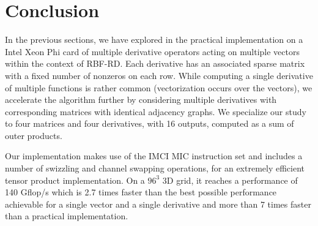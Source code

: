 \documentclass[10pt,conference,compsocconf]{IEEEtran}
\newcommand{\todo}[1]{{\color{red}\textbf{\hl{#1}}\xspace}}
\begin{document}



\section{Conclusion}
\label{sec:ccl}

In the previous sections, we have explored in the practical
implementation on a Intel Xeon Phi card of multiple derivative
operators acting on multiple vectors within the context of
RBF-RD. Each derivative has an associated sparse matrix with a fixed
number of nonzeros on each row. While computing a single derivative of
multiple functions is rather common (vectorization occurs over the
vectors), we accelerate the algorithm further by considering multiple
derivatives with corresponding matrices with identical adjacency
graphs. We specialize our study to four matrices and four derivatives,
with 16 outputs, computed as a sum of outer products.

Our implementation makes use of the IMCI MIC instruction set and
includes a number of swizzling and channel swapping operations, for an
extremely efficient tensor product implementation. On a $96^3$ 3D
grid, it reaches a performance of 140 Gflop/s which is 2.7 times
faster than the best possible performance achievable for a single
vector and a single derivative and more than 7 times faster than a
practical implementation.

\end{document}
